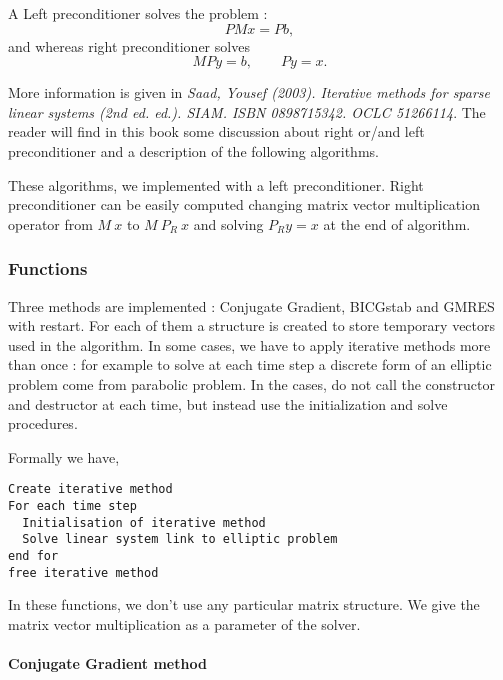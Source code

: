 A Left preconditioner solves the problem :
$$ P M x = P b, $$
and whereas right preconditioner solves
$$ M P y  = b, \quad \quad P y = x.$$


More information is given in {\em Saad, Yousef (2003). Iterative methods for
  sparse linear systems (2nd ed. ed.). SIAM. ISBN 0898715342. OCLC 51266114}.
The reader will find in this book some discussion about right or/and left
preconditioner and a description of the following algorithms.

These algorithms, we implemented with a left preconditioner. Right preconditioner
can be easily computed changing matrix vector multiplication operator from $M \
x $ to $ M \ P_R \ x$ and solving $P_R y = x$ at the end of algorithm.


\subsubsection{Functions}

Three methods are implemented : Conjugate Gradient, BICGstab and GMRES with
restart. For each of them a structure is created to store temporary vectors
used in the algorithm. In some cases, we have to apply iterative methods more
than once : for example to solve at each time step a discrete form of an
elliptic problem come from parabolic problem. In the cases, do not call the constructor and
destructor at each time, but instead use the initialization and solve procedures.

Formally we have, 
\begin{verbatim}
Create iterative method
For each time step
  Initialisation of iterative method
  Solve linear system link to elliptic problem
end for
free iterative method
\end{verbatim}

In these functions, we don't use any particular matrix structure. We give the
matrix vector multiplication as a parameter of the solver. 

\paragraph{Conjugate Gradient method}

